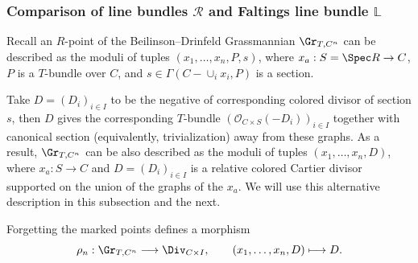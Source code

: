 \documentclass{amsart}
\numberwithin{equation}{section}
\numberwithin{figure}{section}
\theoremstyle{definition}
\theoremstyle{remark}
\renewcommand{\c}[1]{\mathcal{#1}}
\renewcommand{\b}[1]{\mathbb{#1}}
\begin{document}
\subsubsection{Comparison of line bundles $\c R$ and Faltings line bundle $\b L$}
\label{Comparison of R and L}

Recall an $R$-point of the Beilinson--Drinfeld
Grassmannian $\Gr_{T,C^n}$ can be described as the moduli of tuples 
$(x_1,\ldots,x_n,P,s)$, where $x_a:S=\Spec R\to C$, $P$ is a $T$-bundle over $C$, and $s\in\Gamma(C-\cup_i x_i,P)$ is a section. 

Take $D=(D_i)_{i\in I}$ to be the negative of corresponding colored divisor of section $s$, then $D$ gives the corresponding $T$-bundle 
$(\c O_{C\times S}(-D_i))_{i\in I}$ together with canonical section (equivalently, trivialization) away from these graphs. As a result,
 $\Gr_{T,C^n}$ can be also described as the moduli of tuples 
$(x_1,\ldots,x_n,D)$, where $x_a:S\to C$ and
$D=(D_i)_{i\in I}$ is a relative colored Cartier divisor supported on the union of the graphs of
the $x_a$. We will use this alternative description in this subsection and the next.

Forgetting the marked points defines a morphism
\[
\rho_n:\Gr_{T,C^n}\longrightarrow\Div_{C\times I},
\qquad
(x_1,\ldots,x_n,D)\longmapsto D.
\]
\end{document}
